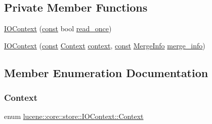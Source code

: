 \subsection*{Private Member Functions}
\begin{DoxyCompactItemize}
\item 
\mbox{\hyperlink{classlucene_1_1core_1_1store_1_1IOContext_a6b459b5ced9ef6f6a337298b314767a4}{I\+O\+Context}} (\mbox{\hyperlink{ZlibCrc32_8h_a2c212835823e3c54a8ab6d95c652660e}{const}} bool \mbox{\hyperlink{classlucene_1_1core_1_1store_1_1IOContext_a1a17d20c19af73dfaf4e72ffd94acd89}{read\+\_\+once}})
\item 
\mbox{\hyperlink{classlucene_1_1core_1_1store_1_1IOContext_a431588a61e52cf327663989bb66f785d}{I\+O\+Context}} (\mbox{\hyperlink{ZlibCrc32_8h_a2c212835823e3c54a8ab6d95c652660e}{const}} \mbox{\hyperlink{classlucene_1_1core_1_1store_1_1IOContext_abe5d85deaa062a50cf92336fd3aeea96}{Context}} \mbox{\hyperlink{classlucene_1_1core_1_1store_1_1IOContext_a9ed3b29ed842a780f6bd8cbe0bb4f215}{context}}, \mbox{\hyperlink{ZlibCrc32_8h_a2c212835823e3c54a8ab6d95c652660e}{const}} \mbox{\hyperlink{classlucene_1_1core_1_1store_1_1MergeInfo}{Merge\+Info}} \mbox{\hyperlink{classlucene_1_1core_1_1store_1_1IOContext_a2f13bbd721dcecb605212a6269b5baa7}{merge\+\_\+info}})
\end{DoxyCompactItemize}


\subsection{Member Enumeration Documentation}
\mbox{\label{classlucene_1_1core_1_1store_1_1IOContext_abe5d85deaa062a50cf92336fd3aeea96}} 
\subsubsection{\texorpdfstring{Context}{Context}}
{\footnotesize\ttfamily enum \mbox{\hyperlink{classlucene_1_1core_1_1store_1_1IOContext_abe5d85deaa062a50cf92336fd3aeea96}{lucene\+::core\+::store\+::\+I\+O\+Context\+::\+Context}}\hspace{0.3cm}{\ttfamily [strong]}}

